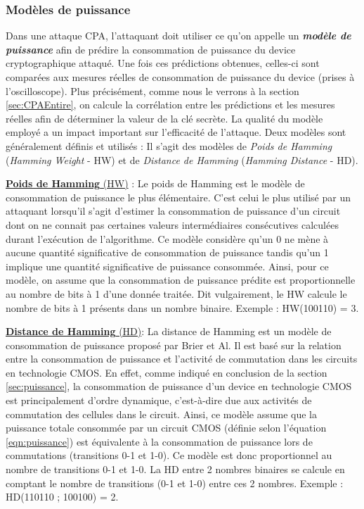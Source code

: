 \documentclass[oneside]{book}
\begin{document}
\subsubsection{Modèles de puissance}
\label{sec:modelpuissance}
\vspace{-0.1 cm}Dans une attaque CPA, l'attaquant doit utiliser ce qu'on appelle un \textbf{\textit{modèle de puissance}} afin de prédire la consommation de puissance du device cryptographique attaqué. Une fois ces prédictions obtenues, celles-ci sont comparées aux mesures réelles de consommation de puissance du device (prises à l'oscilloscope). Plus précisément, comme nous le verrons à la section \ref{sec:CPAEntire}, on calcule la corrélation entre les prédictions et les mesures réelles afin de déterminer la valeur de la clé secrète. La qualité du modèle employé a un impact important sur l'efficacité de l'attaque. Deux modèles sont généralement définis et utilisés : Il s'agit des modèles de \textit{Poids de Hamming} (\textit{Hamming Weight} - HW) et de \textit{Distance de Hamming} (\textit{Hamming Distance} - HD).

\underline{\textbf{Poids de Hamming} (HW)} : Le poids de Hamming est le modèle de consommation de puissance le plus élémentaire. C'est celui le plus utilisé par un attaquant lorsqu'il s'agit d'estimer la consommation de puissance d'un circuit dont on ne connait pas certaines valeurs intermédiaires consécutives calculées durant l'exécution de l'algorithme. Ce modèle considère qu'un 0 ne mène à aucune quantité significative de consommation de puissance tandis qu'un 1 implique une quantité significative de puissance consommée. Ainsi, pour ce modèle, on assume que la consommation de puissance prédite est proportionnelle au nombre de bits à 1 d'une donnée traitée. Dit vulgairement, le HW calcule le nombre de bits à 1 présents dans un nombre binaire. Exemple : HW(100110) = 3.

\underline{\textbf{Distance de Hamming} (HD)}: La distance de Hamming est un modèle de consommation de puissance proposé par Brier et Al. Il est basé sur la relation entre la consommation de puissance et l'activité de commutation dans les circuits en technologie CMOS. En effet, comme indiqué en conclusion de la section \ref{sec:puissance}, la consommation de puissance d'un device en technologie CMOS est principalement d'ordre dynamique, c'est-à-dire due aux activités de commutation des cellules dans le circuit. Ainsi, ce modèle assume que la puissance totale consommée par un circuit CMOS (définie selon l'équation \ref{eqn:puissance}) est équivalente à la consommation de puissance lors de commutations (transitions 0-1 et 1-0). Ce modèle est donc proportionnel au nombre de transitions 0-1 et 1-0. La HD entre 2 nombres binaires se calcule en comptant le nombre de transitions (0-1 et 1-0) entre ces 2 nombres. Exemple : HD(110110 ; 100100) = 2.
\end{document}

